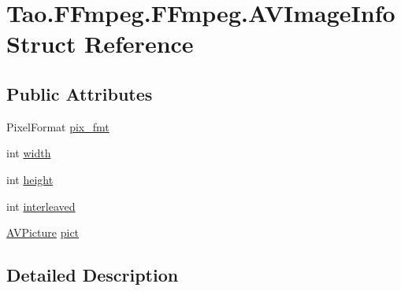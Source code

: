 \hypertarget{struct_tao_1_1_f_fmpeg_1_1_f_fmpeg_1_1_a_v_image_info}{
\section{Tao.FFmpeg.FFmpeg.AVImageInfo Struct Reference}
\label{struct_tao_1_1_f_fmpeg_1_1_f_fmpeg_1_1_a_v_image_info}
}
\subsection*{Public Attributes}
\begin{DoxyCompactItemize}
\item 
PixelFormat \hyperlink{struct_tao_1_1_f_fmpeg_1_1_f_fmpeg_1_1_a_v_image_info_a5d35754aa35464fcb3a2b2ccbb8c4399}{pix\_\-fmt}
\item 
int \hyperlink{struct_tao_1_1_f_fmpeg_1_1_f_fmpeg_1_1_a_v_image_info_aad9c17eaa373f65aec87583287117e8a}{width}
\item 
int \hyperlink{struct_tao_1_1_f_fmpeg_1_1_f_fmpeg_1_1_a_v_image_info_aeeb828a15f199f09a5bd874dd7f1b12f}{height}
\item 
int \hyperlink{struct_tao_1_1_f_fmpeg_1_1_f_fmpeg_1_1_a_v_image_info_aada9b9f5eee9d586fadeff4b0938fd2f}{interleaved}
\item 
\hyperlink{struct_tao_1_1_f_fmpeg_1_1_f_fmpeg_1_1_a_v_picture}{AVPicture} \hyperlink{struct_tao_1_1_f_fmpeg_1_1_f_fmpeg_1_1_a_v_image_info_aeb9032217fd4d494688db378225a3acc}{pict}
\end{DoxyCompactItemize}


\subsection{Detailed Description}


